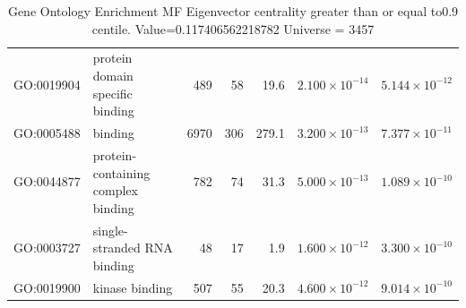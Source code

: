 \begin{table}[ht]
\begin{tabular}{llrrrrr}
  GO:0019904 & protein domain specific binding & 489 & 58 & 19.6 & $2.100 \times 10^{-14}$ & $5.144 \times 10^{-12}$ \\ 
  GO:0005488 & binding & 6970 & 306 & 279.1 & $3.200 \times 10^{-13}$ & $7.377 \times 10^{-11}$ \\ 
  GO:0044877 & protein-containing complex binding & 782 & 74 & 31.3 & $5.000 \times 10^{-13}$ & $1.089 \times 10^{-10}$ \\ 
  GO:0003727 & single-stranded RNA binding & 48 & 17 & 1.9 & $1.600 \times 10^{-12}$ & $3.300 \times 10^{-10}$ \\ 
  GO:0019900 & kinase binding & 507 & 55 & 20.3 & $4.600 \times 10^{-12}$ & $9.014 \times 10^{-10}$ \\ 
   \hline
\end{tabular}
\caption{Gene Ontology Enrichment MF Eigenvector centrality  greater than or equal to0.9 centile.   Value=0.117406562218782 Universe = 3457} 
\label{tab:Gene Ontology Enrichment MF Eigenvector centrality  greater than or equal to0.9 centile.   Value=0.117406562218782 Universe = 3457}
\end{table}

